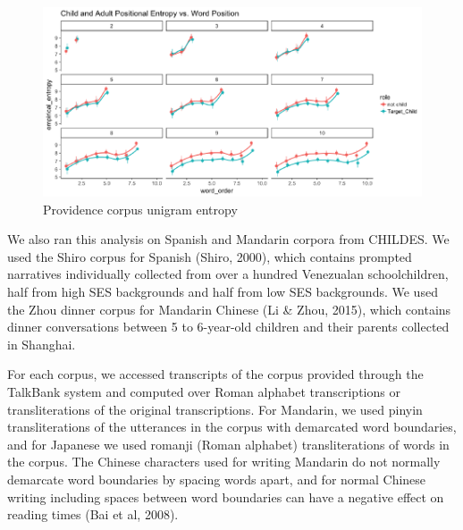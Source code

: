 \documentclass[10pt, letterpaper]{article}
\newenvironment{CodeChunk}{}{}
\begin{document}
\begin{CodeChunk}
\begin{figure}[h]

{\centering \includegraphics{figs/providence_PE-1} 

}

\caption[Providence corpus unigram entropy]{Providence corpus unigram entropy}\label{fig:providence_PE}
\end{figure}
\end{CodeChunk}

We also ran this analysis on Spanish and Mandarin corpora from CHILDES.
We used the Shiro corpus for Spanish (Shiro, 2000), which contains
prompted narratives individually collected from over a hundred
Venezualan schoolchildren, half from high SES backgrounds and half from
low SES backgrounds. We used the Zhou dinner corpus for Mandarin Chinese
(Li \& Zhou, 2015), which contains dinner conversations between 5 to
6-year-old children and their parents collected in Shanghai.

For each corpus, we accessed transcripts of the corpus provided through
the TalkBank system and computed over Roman alphabet transcriptions or
transliterations of the original transcriptions. For Mandarin, we used
pinyin transliterations of the utterances in the corpus with demarcated
word boundaries, and for Japanese we used romanji (Roman alphabet)
transliterations of words in the corpus. The Chinese characters used for
writing Mandarin do not normally demarcate word boundaries by spacing
words apart, and for normal Chinese writing including spaces between
word boundaries can have a negative effect on reading times (Bai et al,
2008).
\end{document}
